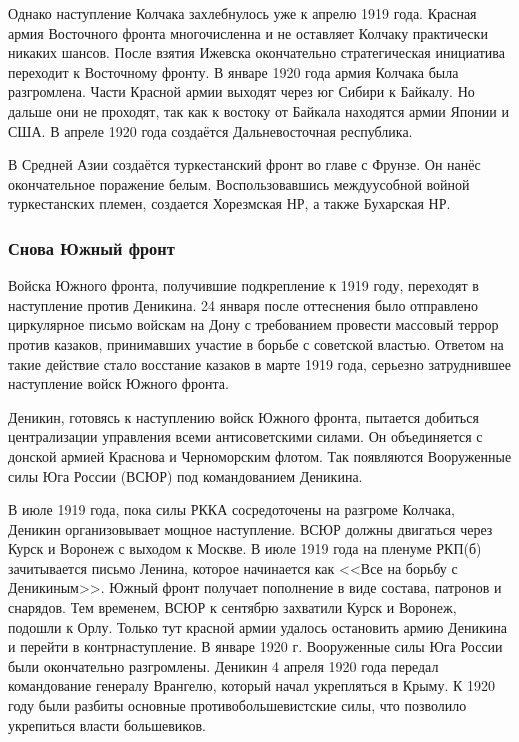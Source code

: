 Однако наступление Колчака захлебнулось уже к апрелю 1919 года. Красная армия Восточного фронта многочисленна и не оставляет Колчаку практически никаких шансов. После взятия Ижевска окончательно стратегическая инициатива переходит к Восточному фронту.
В январе 1920 года армия Колчака была разгромлена. Части Красной армии выходят через юг Сибири к Байкалу. Но дальше они не проходят, так как к востоку от Байкала находятся армии Японии и США. В апреле 1920 года создаётся Дальневосточная республика.

В Средней Азии создаётся туркестанский фронт во главе с Фрунзе. Он нанёс окончательное поражение белым. Воспользовавшись междуусобной войной туркестанских племен, создается Хорезмская НР, а также Бухарская НР.

\subsubsection{Снова Южный фронт}

Войска Южного фронта, получившие подкрепление к 1919 году, переходят в наступление против Деникина.
24 января после оттеснения было отправлено циркулярное письмо войскам на Дону с требованием провести массовый террор против казаков, принимавших участие в борьбе с советской властью.
Ответом на такие действие стало восстание казаков в марте 1919 года, серьезно затруднившее наступление войск Южного фронта.

Деникин, готовясь к наступлению войск Южного фронта, пытается добиться централизации управления всеми антисоветскими силами. Он объединяется с донской армией Краснова и Черноморским флотом. Так появляются Вооруженные силы Юга России (ВСЮР) под командованием Деникина.

В июле 1919 года, пока силы РККА сосредоточены на разгроме Колчака, Деникин организовывает мощное наступление. ВСЮР должны двигаться через Курск и Воронеж с выходом к Москве. В июле 1919 года на пленуме РКП(б) зачитывается письмо Ленина, которое начинается как <<Все на борьбу с Деникиным>>. Южный фронт получает пополнение в виде состава, патронов и снарядов. Тем временем, ВСЮР к сентябрю захватили Курск и Воронеж, подошли к Орлу. Только тут красной армии удалось остановить армию Деникина и перейти в контрнаступление. В январе 1920 г. Вооруженные силы Юга России были окончательно разгромлены. Деникин 4 апреля 1920 года передал командование генералу Врангелю, который начал укрепляться в Крыму.
К 1920 году были разбиты основные противобольшевистские силы, что позволило укрепиться власти большевиков.

